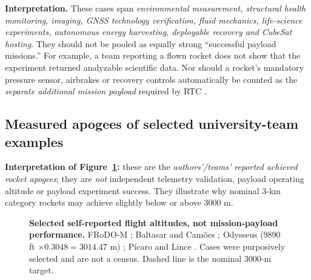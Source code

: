 \documentclass[10pt,a4paper]{article}
\begin{document}
\textbf{Interpretation.} These cases span \emph{environmental measurement, structural health monitoring, imaging, GNSS technology verification, fluid mechanics, life-science experiments, autonomous energy harvesting, deployable recovery and CubeSat hosting}. They should not be pooled as equally strong ``successful payload missions.'' For example, a team reporting a flown rocket does not show that the experiment returned analyzable scientific data. Nor should a rocket's mandatory pressure sensor, airbrakes or recovery controls automatically be counted as the \emph{separate additional mission payload} required by RTC \cite{rtc2027rules}.

\subsection{Measured apogees of selected university-team examples}
\textbf{Interpretation of Figure~\ref{fig:payloadapogee}:} these are the \emph{authors'/teams' reported achieved rocket apogees}; they are \emph{not} independent telemetry validation, payload operating altitude or payload experiment success. They illustrate why nominal 3-km category rockets may achieve slightly below or above 3000 m.
\begin{figure}[htbp]\centering
{}
\caption{\textbf{Selected self-reported flight altitudes, not mission-payload performance.} FRoDO-M \cite{tudsat2024frodo}; Baltasar and Cam\~oes \cite{red2022baltasar,red2023camoes}; Odysseus (9890 ft $\times0.3048=3014.47$ m) \cite{ucf2026odysseus}; P\'icaro and Lince \cite{star2024picaro,star2023lince}. Cases were purposively selected and are not a census. Dashed line is the nominal 3000-m target.}
\label{fig:payloadapogee}
\end{figure}
\end{document}
